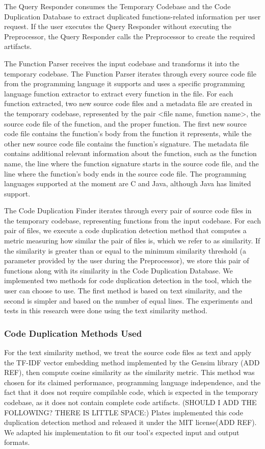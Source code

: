 \documentclass[conference]{IEEEtran}
\begin{document}
The Query Responder consumes the Temporary Codebase and the Code Duplication Database to extract duplicated 
functions-related information per user request. If the user executes the Query Responder without executing the 
Preprocessor, the Query Responder calls the Preprocessor to create the required artifacts.

The Function Parser receives the input codebase and transforms it into the temporary
codebase. The Function Parser iterates through every source code file from the programming 
language it supports and uses a specific programming language function extractor
to extract every function in the file. For each function extracted, two new source code files
and a metadata file are created in the temporary codebase, represented by the pair <file
name, function name>, the source code file of the function, and the proper function.
The first new source code file contains the function’s body from the function it represents,
while the other new source code file contains the function’s signature. The metadata file
contains additional relevant information about the function, such as the function name,
the line where the function signature starts in the source code file, and the line where the
function’s body ends in the source code file. The programming languages supported at
the moment are C and Java, although Java has limited support.

The Code Duplication Finder iterates through every pair of source code files in the
temporary codebase, representing functions from the input codebase. For each pair of
files, we execute a code duplication detection method that computes a metric measuring
how similar the pair of files is, which we refer to as similarity. If the similarity is greater
than or equal to the minimum similarity threshold (a parameter provided by the user
during the Preprocessor), we store this pair of functions along with its similarity in the
Code Duplication Database. 
We implemented two methods for code duplication detection in the tool, which the user
can choose to use. The first method is based on text similarity, and the second is simpler
and based on the number of equal lines. The experiments and tests in this research were
done using the text similarity method.

\subsubsection{Code Duplication Methods Used}

For the text similarity method, we treat the source code files as text and apply the
TF-IDF vector embedding method implemented by the Gensim library (ADD REF),
then compute cosine similarity as the similarity metric. This method was chosen for 
its claimed performance, programming language independence, and the fact that it does 
not require compilable code, which is expected in the
temporary codebase, as it does not contain complete code artifacts.
(SHOULD I ADD THE FOLLOWING? THERE IS LITTLE SPACE:) 
Plates implemented this code duplication detection method and released it under
the MIT license(ADD REF). We adapted his implementation to fit our tool’s expected
input and output formats. 
\end{document}
